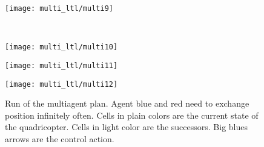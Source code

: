\begin{figure}
\begin{minipage}{0.3\textwidth}
  \end{minipage} 
  \begin{minipage}{0.3\textwidth}
    \centering
    \texttt{[image: multi\_ltl/multi9]}
  \end{minipage} 
  \\[\FigVSkip]%
  \begin{minipage}{0.3\textwidth}
    \centering
    \texttt{[image: multi\_ltl/multi10]}
  \end{minipage} 
  \begin{minipage}{0.3\textwidth}
    \centering
    \texttt{[image: multi\_ltl/multi11]}
  \end{minipage} 
  \begin{minipage}{0.3\textwidth}
    \centering
    \texttt{[image: multi\_ltl/multi12]}
  \end{minipage} 

\caption{Run of the multiagent plan. Agent blue and red need to exchange position infinitely often. Cells in plain colors are the current state of the quadricopter. Cells in light color are the successors. Big blues arrows are the control action.}
\label{fig:multi}
\end{figure}
